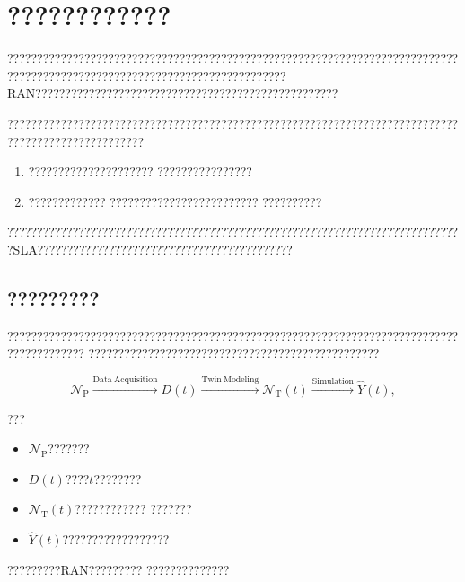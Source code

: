 \chapter{????????????}
\label{chap:high_fidelity_network_digital_twin}

???????????????????????????????????????????????????????????????????????????????????????????????????????????????????????????RAN???????????????????????????????????????????????????

???????????????????????????????????????????????????????????????????????????????????????????????????

\begin{enumerate}[label=\arabic*)]
    \item ?????????????????????
    ????????????????
    \item ?????????????
    ?????????????????????????
    ??????????
\end{enumerate}

?????????????????????????????????????????????????????????????????????????????SLA???????????????????????????????????????????

\section{?????????}
\label{sec:high_fidelity_twin_overview}

?????????????????????????????????????????????????????????????????????????????????????????
?????????????????????????????????????????????????

\begin{equation}
\mathcal{N}_{\mathrm{P}}
\xrightarrow{\mathrm{Data\ Acquisition}}
D(t)
\xrightarrow{\mathrm{Twin\ Modeling}}
\mathcal{N}_{\mathrm{T}}(t)
\xrightarrow{\mathrm{Simulation}}
\hat{Y}(t),
\label{eq:physical_to_twin_overview}
\end{equation}

???

\begin{itemize}
    \item $\mathcal{N}_{\mathrm{P}}$???????
    \item $D(t)$????$t$????????
    \item $\mathcal{N}_{\mathrm{T}}(t)$????????????
    ???????
    \item $\hat{Y}(t)$??????????????????
\end{itemize}

?????????RAN?????????
??????????????

